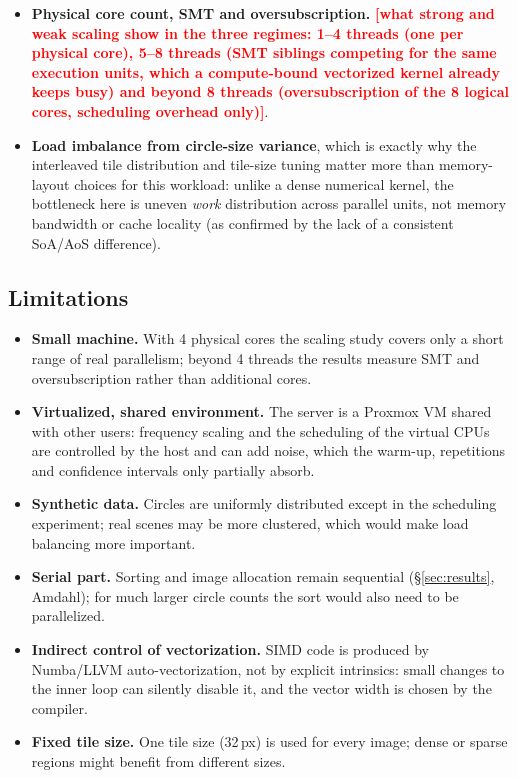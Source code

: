 \documentclass[10pt,twocolumn,letterpaper]{article}
\newcommand{\tbd}[1]{\textcolor{red}{\textbf{[#1]}}}
\begin{document}
\begin{itemize}[itemsep=1pt,topsep=2pt]
  \item \textbf{Physical core count, SMT and oversubscription.}
    \tbd{what strong and weak scaling show in the three regimes: 1--4 threads
    (one per physical core), 5--8 threads (SMT siblings competing for the
    same execution units, which a compute-bound vectorized kernel already
    keeps busy) and beyond 8 threads (oversubscription of the 8 logical
    cores, scheduling overhead only)}.
  \item \textbf{Load imbalance from circle-size variance}, which is exactly
    why the interleaved tile distribution and tile-size tuning matter
    more than memory-layout choices for this workload: unlike a dense
    numerical kernel, the bottleneck here is uneven \emph{work} distribution
    across parallel units, not memory bandwidth or cache locality (as
    confirmed by the lack of a consistent SoA/AoS difference).
\end{itemize}

\subsection{Limitations}

\begin{itemize}[itemsep=1pt,topsep=2pt]
  \item \textbf{Small machine.} With 4 physical cores the scaling study
    covers only a short range of real parallelism; beyond 4 threads the
    results measure SMT and oversubscription rather than additional cores.
  \item \textbf{Virtualized, shared environment.} The server is a Proxmox VM
    shared with other users: frequency scaling and the scheduling of the
    virtual CPUs are controlled by the host and can add noise, which the
    warm-up, repetitions and confidence intervals only partially absorb.
  \item \textbf{Synthetic data.} Circles are uniformly distributed except
    in the scheduling experiment; real scenes may be more clustered, which
    would make load balancing more important.
  \item \textbf{Serial part.} Sorting and image allocation remain
    sequential (\S\ref{sec:results}, Amdahl); for much larger circle counts
    the sort would also need to be parallelized.
  \item \textbf{Indirect control of vectorization.} SIMD code is produced by
    Numba/LLVM auto-vectorization, not by explicit intrinsics: small changes
    to the inner loop can silently disable it, and the vector width is
    chosen by the compiler.
  \item \textbf{Fixed tile size.} One tile size (32\,px) is used for every
    image; dense or sparse regions might benefit from different sizes.
\end{itemize}
\end{document}
